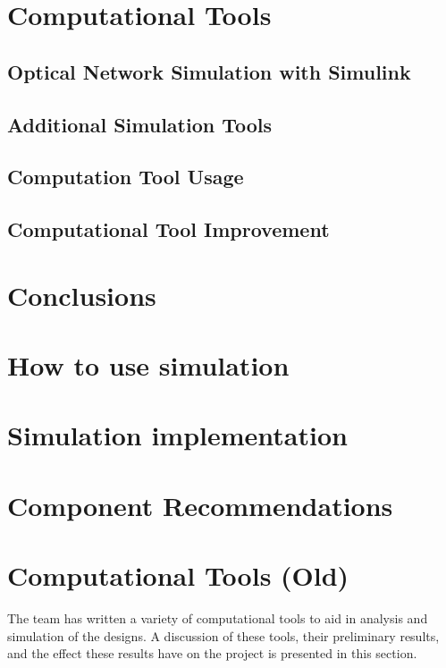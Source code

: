 \documentclass[pdftex,12pt,a4paper]{article}
\begin{document}
\section{Computational Tools}
\label{sec:comp}

\subsection{Optical Network Simulation with Simulink}

\subsection{Additional Simulation Tools}

\subsection{Computation Tool Usage}

\subsection{Computational Tool Improvement}


\section{Conclusions}
\label{sec:conclusions}


\appendix
\section{How to use simulation}

\section{Simulation implementation}

\section{Component Recommendations}

\section{Computational Tools (Old)}
\label{sec:results}
The team has written a variety of computational tools to aid in analysis and simulation of the designs. A discussion of these tools, their preliminary results, and the effect these results have on the project is presented in this section.
\end{document}
